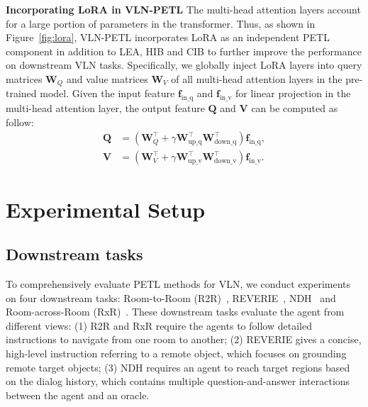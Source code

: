 \documentclass[10pt,twocolumn,letterpaper]{article}
\def\vf{{\bm{f}}}
\def\mQ{{\bm{Q}}}
\def\mV{{\bm{V}}}
\def\mW{{\bm{W}}}
\begin{document}
\noindent\textbf{Incorporating LoRA in VLN-PETL}
The multi-head attention layers account for a large portion of parameters in the transformer. 
Thus, 
as shown in Figure~\ref{fig:lora}, VLN-PETL incorporates LoRA as an independent PETL component in addition to LEA, HIB and CIB to further improve the performance on downstream VLN tasks. Specifically, we globally inject LoRA layers into query matrices $\mW_Q$ and value matrices $\mW_V$ of all multi-head attention layers  
in the pre-trained model. Given the input feature $\vf_{\text{in\_q}}$ and $\vf_{\text{in\_v}}$ for linear projection in the multi-head attention layer, the output feature $\mQ$ and $\mV$ can be computed as follow:
\begin{align}
    \mQ &= (\mW_Q^\intercal + \gamma \mW_{\text{up\_q}}^\intercal \mW_{\text{down\_q}}^\intercal) \vf_{\text{in\_q}}, \\
    \mV &= (\mW_V^\intercal + \gamma  \mW_{\text{up\_v}}^\intercal \mW_{\text{down\_v}}^\intercal) \vf_{\text{in\_v}}.
\end{align}
 \section{Experimental Setup}
\label{sec:experiment}


\subsection{Downstream tasks}
To comprehensively evaluate PETL methods for VLN, we conduct experiments on four downstream tasks: Room-to-Room (R2R)~\cite{r2r}, REVERIE~\cite{reverie}, NDH~\cite{ndh} and Room-across-Room (RxR)~\cite{rxr}. These downstream tasks evaluate the agent from different views: (1) R2R and RxR require the agents to follow detailed instructions to navigate from one room to another; (2) REVERIE gives a concise, high-level instruction referring to a remote object, which focuses on grounding remote target objects; (3) NDH requires an agent to reach target regions based on the dialog history, which contains multiple question-and-answer interactions between the agent and an oracle. 
\end{document}
